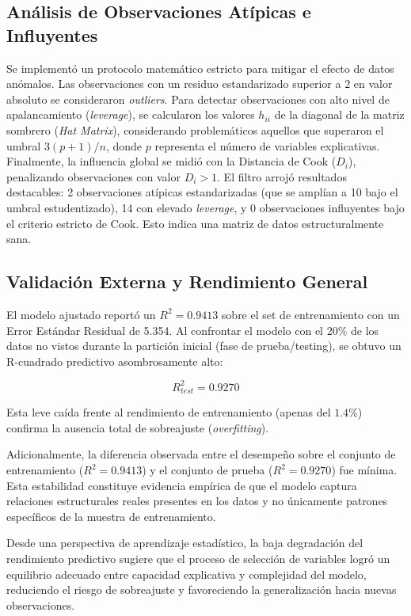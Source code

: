 \documentclass[procedia]{easychair}
\begin{document}
\subsection{Análisis de Observaciones Atípicas e Influyentes }
Se implementó un protocolo matemático estricto para mitigar el efecto de datos anómalos. Las observaciones con un residuo estandarizado superior a 2 en valor absoluto se consideraron \textit{outliers}. Para detectar observaciones con alto nivel de apalancamiento (\textit{leverage}), se calcularon los valores $h_{ii}$ de la diagonal de la matriz sombrero (\textit{Hat Matrix}), considerando problemáticos aquellos que superaron el umbral $3(p + 1)/n$, donde $p$ representa el número de variables explicativas. Finalmente, la influencia global se midió con la Distancia de Cook ($D_{i}$), penalizando observaciones con valor $D_{i} > 1$. El filtro arrojó resultados destacables: 2 observaciones atípicas estandarizadas (que se amplían a 10 bajo el umbral estudentizado), 14 con elevado \textit{leverage}, y 0 observaciones influyentes bajo el criterio estricto de Cook. Esto indica una matriz de datos estructuralmente sana.

\subsection{Validación Externa y Rendimiento General}
El modelo ajustado reportó un $R^2 = 0.9413$ sobre el set de entrenamiento con un Error Estándar Residual de 5.354. Al confrontar el modelo con el 20\% de los datos no vistos durante la partición inicial (fase de prueba/testing), se obtuvo un R-cuadrado predictivo asombrosamente alto:

\begin{equation}
R^2_{test} = 0.9270
\end{equation}

Esta leve caída frente al rendimiento de entrenamiento (apenas del $1.4\%$) confirma la ausencia total de sobreajuste (\textit{overfitting}).

Adicionalmente, la diferencia observada entre el desempeño
sobre el conjunto de entrenamiento ($R^2=0.9413$) y el
conjunto de prueba ($R^2=0.9270$) fue mínima. Esta
estabilidad constituye evidencia empírica de que el modelo
captura relaciones estructurales reales presentes en los datos
y no únicamente patrones específicos de la muestra de
entrenamiento.

Desde una perspectiva de aprendizaje estadístico, la baja
degradación del rendimiento predictivo sugiere que el proceso
de selección de variables logró un equilibrio adecuado entre
capacidad explicativa y complejidad del modelo, reduciendo el
riesgo de sobreajuste y favoreciendo la generalización hacia
nuevas observaciones.
\end{document}
